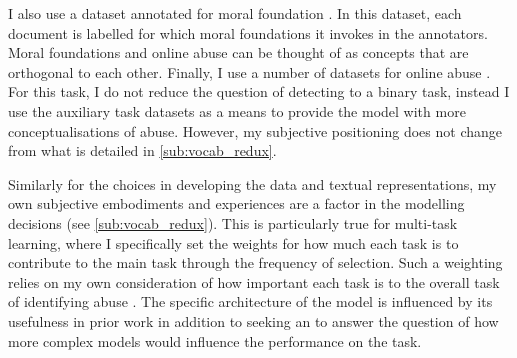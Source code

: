 I also use a dataset annotated for moral foundation \citep{Hoover:2019}.
In this dataset, each document is labelled for which moral foundations it invokes in the annotators.
Moral foundations and online abuse can be thought of as concepts that are orthogonal to each other. 
Finally, I use a number of datasets for online abuse \citep{Garcia:2018,Waseem:2016,Waseem-Hovy:2016,Davidson:2017,Wulczyn:2016}.
For this task, I do not reduce the question of detecting to a binary task, instead I use the auxiliary task datasets as a means to provide the model with more conceptualisations of abuse.
However, my subjective positioning does not change from what is detailed in \autoref{sub:vocab_redux}.

Similarly for the choices in developing the data and textual representations, my own subjective embodiments and experiences are a factor in the modelling decisions (see \cref{sub:vocab_redux}).
This is particularly true for multi-task learning, where I specifically set the weights for how much each task is to contribute to the main task through the frequency of selection.
Such a weighting relies on my own consideration of how important each task is to the overall task of identifying abuse .
The specific architecture of the model is influenced by its usefulness in prior work \citep{Bingel:2018} in addition to seeking an to answer the question of how more complex models would influence the performance on the task.


